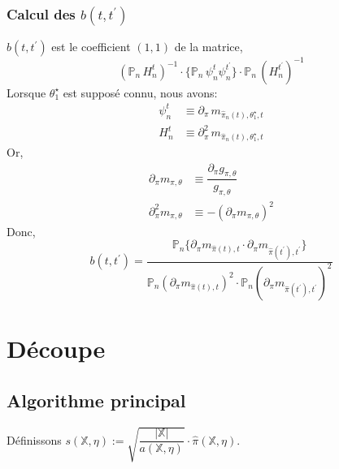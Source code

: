 \documentclass{article}
\begin{document}
            \subsubsection*{Calcul des $b(t,t^\prime)$}
                $b(t,t^\prime)$ est le coefficient $(1,1)$ de la matrice,
                    $$  (\mathbb{P}_n\, H_n^t)^{-1}\cdot\{\mathbb{P}_n\, \psi^t_n\psi_n^{t^\prime}\}\cdot\mathbb{P}_n\, (H_n^{t^\prime})^{-1} $$
                Lorsque $\theta_1^\star$ est supposé connu, nous avons:
                \begin{align*}
                    \psi_n^t    & \equiv \partial_\pi\, m_{\hat\pi_n(t),\theta_1^\star,t} \\
                    H_n^t       & \equiv \partial^2_\pi\,m_{\hat\pi_n(t),\theta_1^\star,t}
                \end{align*}
                Or,
                \begin{align*}
                    \partial_\pi m_{\pi,\theta} & \equiv \dfrac{\partial_\pi g_{\pi,\theta}}{g_{\pi,\theta}} \\
                    \partial^2_\pi m_{\pi,\theta} & \equiv - (\partial_\pi m_{\pi,\theta})^2 
                \end{align*}
                Donc,
                    $$ b(t,t^\prime) = \dfrac{\mathbb{P}_n\{ \partial_\pi m_{\hat\pi(t),t}\cdot\partial_\pi m_{\hat\pi(t^\prime),t^\prime}\}}{\mathbb{P}_n (\partial_\pi m_{\hat\pi(t),t})^2\cdot\mathbb{P}_n (\partial_\pi m_{\hat\pi(t^\prime),t^\prime})^2} $$

    \section{Découpe}
        \subsection{Algorithme principal}

            Définissons $s(\mathbb{X},\eta) := \sqrt{\dfrac{|\mathbb{X}|}{a(\mathbb{X},\eta)}}\cdot\hat\pi(\mathbb{X},\eta)$. %
\end{document}
